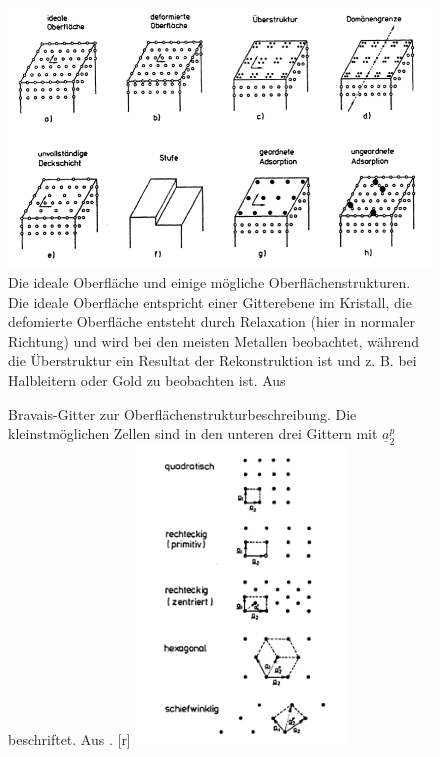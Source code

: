 \begin{figure}
    \includegraphics[width=1.0\textwidth]{pics/oberflaechenstruktur}
    \caption{Die ideale Oberfläche und einige mögliche Oberflächenstrukturen. 
Die ideale Oberfläche entspricht einer Gitterebene im Kristall, die defomierte 
Oberfläche entsteht durch Relaxation (hier in normaler Richtung) und wird bei den 
meisten Metallen beobachtet, während die Überstruktur ein Resultat der Rekonstruktion 
ist und z. B. bei Halbleitern oder Gold zu beobachten ist. 
Aus \cite{henzler1991oberflachenphysik} }
\label{fig:oberflaeche}
\end{figure} 
\begin{figure}
  \begin{captionbeside}{Bravais-Gitter zur Oberflächenstrukturbeschreibung. Die 
kleinstmöglichen Zellen sind in den unteren drei Gittern mit $\underline{a}_2^p$ 
beschriftet. 
Aus \cite{henzler1991oberflachenphysik}. }[r]
    \includegraphics[width=0.5\textwidth]{pics/Bravais}
  \end{captionbeside}
  \label{fig:Bravais}
\end{figure} 


